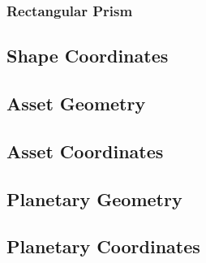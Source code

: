 \documentclass{article}
\begin{document}
\subsubsection{Rectangular Prism}
\label{sssec:RectangularPrism}


\subsection{Shape Coordinates}
\label{ssec:ShapeCoordinates}


\subsection{Asset Geometry}
\label{ssec:AssetGeometry}


\subsection{Asset Coordinates}
\label{ssec:AssetCoordinates}


\subsection{Planetary Geometry}
\label{ssec:PlanetaryGeometry}

\subsection{Planetary Coordinates}
\label{ssec:PlanetaryCoordinates}
\end{document}
